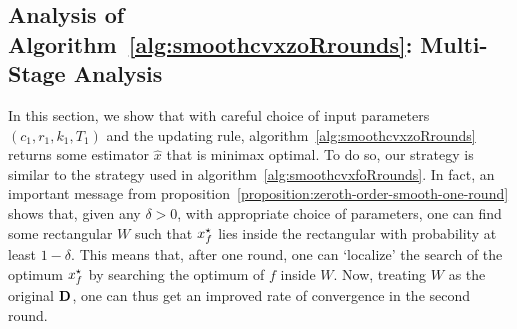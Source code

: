 

\subsection{Analysis of Algorithm~\ref{alg:smoothcvxzoRrounds}: Multi-Stage Analysis}
In this section, we show that with careful choice of input parameters 
$(c_1, r_1, k_1, T_1)$ and the updating rule, algorithm~\ref{alg:smoothcvxzoRrounds} 
returns some estimator $\hat{x}$ that is minimax optimal. To do so, our 
strategy is similar to the strategy used in algorithm~\ref{alg:smoothcvxfoRrounds}.
In fact, an important message from proposition~\ref{proposition:zeroth-order-smooth-one-round} 
shows that, given any $\delta > 0$, with appropriate choice of parameters, one 
can find some rectangular $W$ such that $x_f^\star$ lies inside the rectangular 
with probability at least $1-\delta$. This means that, after one round, one can 
`localize' the search of the optimum $x_f^\star$ by searching the optimum of 
$f$ inside $W$. Now, treating $W$ as the original $\mathbf{D}$, one can 
thus get an improved rate of convergence in the second round.  


